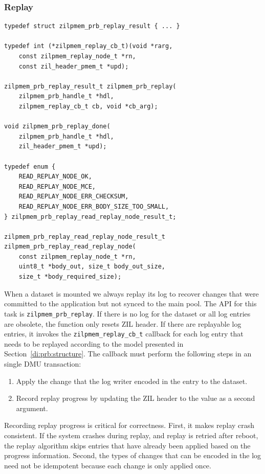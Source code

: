 \documentclass[12pt,a4paper,twoside]{book}
\begin{document}

\subsubsection{Replay}

\begin{lstlisting}
typedef struct zilpmem_prb_replay_result { ... }

typedef int (*zilpmem_replay_cb_t)(void *rarg,
    const zilpmem_replay_node_t *rn,
    const zil_header_pmem_t *upd);

zilpmem_prb_replay_result_t zilpmem_prb_replay(
    zilpmem_prb_handle_t *hdl,
    zilpmem_replay_cb_t cb, void *cb_arg);

void zilpmem_prb_replay_done(
    zilpmem_prb_handle_t *hdl,
    zil_header_pmem_t *upd);

typedef enum {
	READ_REPLAY_NODE_OK,
	READ_REPLAY_NODE_MCE,
	READ_REPLAY_NODE_ERR_CHECKSUM,
	READ_REPLAY_NODE_ERR_BODY_SIZE_TOO_SMALL,
} zilpmem_prb_replay_read_replay_node_result_t;

zilpmem_prb_replay_read_replay_node_result_t
zilpmem_prb_replay_read_replay_node(
    const zilpmem_replay_node_t *rn,
    uint8_t *body_out, size_t body_out_size,
    size_t *body_required_size);
\end{lstlisting}

When a dataset is mounted we always replay its log to recover changes that were committed to the application but not synced to the main pool.
The API for this task is \lstinline{zilpmem_prb_replay}.
If there is no log for the dataset or all log entries are obsolete, the function only resets ZIL header.
If there are replayable log entries, it invokes the \lstinline{zilpmem_replay_cb_t} callback for each log entry that needs to be replayed according to the model presented in Section~\ref{di:prb:structure}.
The callback must perform the following steps in an single DMU transaction:
\begin{enumerate}[noitemsep]
    \item Apply the change that the log writer encoded in the entry to the dataset.
    \item Record replay progress by updating the ZIL header to the value as a second argument.
\end{enumerate}
Recording replay progress is critical for correctness.
First, it makes replay crash consistent.
If the system crashes during replay, and replay is retried after reboot, the replay algorithm skips entries that have already been applied based on the progress information.
Second, the types of changes that can be encoded in the log need not be idempotent because each change is only applied once.
\end{document}
